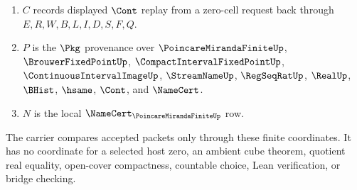 \begin{definition}
\begin{enumerate}
\item $C$ records displayed $\Cont$ replay from a zero-cell request back through $E,R,W,B,L,I,D,S,F,Q$.
\item $P$ is the $\Pkg$ provenance over $\PoincareMirandaFiniteUp$, $\BrouwerFixedPointUp$, $\CompactIntervalFixedPointUp$, $\ContinuousIntervalImageUp$, $\StreamNameUp$, $\RegSeqRatUp$, $\RealUp$, $\BHist$, $\hsame$, $\Cont$, and $\NameCert$.
\item $N$ is the local $\NameCert_{\PoincareMirandaFiniteUp}$ row.
\end{enumerate}
The carrier compares accepted packets only through these finite coordinates. It has no coordinate for a selected host zero, an ambient cube theorem, quotient real equality, open-cover compactness, countable choice, Lean verification, or bridge checking.
\end{definition}


